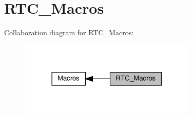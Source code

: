 \hypertarget{group___r_t_c___macros}{}\section{R\+T\+C\+\_\+\+Macros}
\label{group___r_t_c___macros}
Collaboration diagram for R\+T\+C\+\_\+\+Macros\+:
\nopagebreak
\begin{figure}[H]
\begin{center}
\leavevmode
\includegraphics[width=240pt]{group___r_t_c___macros}
\end{center}
\end{figure}
